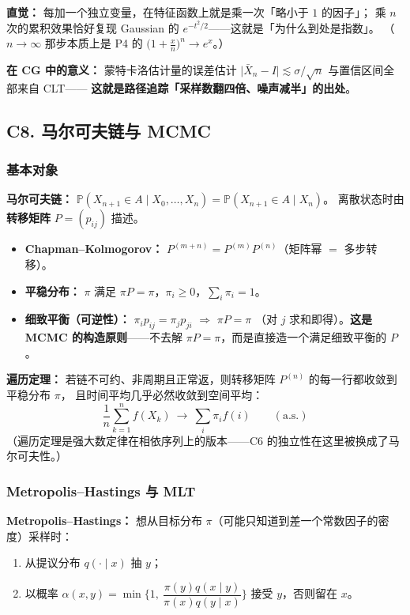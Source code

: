\textbf{直觉：} 每加一个独立变量，在特征函数上就是乘一次「略小于 $1$ 的因子」；
乘 $n$ 次的累积效果恰好复现 Gaussian 的 $e^{-t^2/2}$——这就是「为什么到处是指数」。
（$n\to\infty$ 那步本质上是 P4 的 $\big(1+\frac xn\big)^n\to e^x$。）

\textbf{在 CG 中的意义：} 蒙特卡洛估计量的误差估计
$\big|\bar X_n-I\big|\lesssim \sigma/\sqrt n$ 与置信区间全部来自 CLT——
\textbf{这就是路径追踪「采样数翻四倍、噪声减半」的出处}。

\subsection{C8. 马尔可夫链与 MCMC}

\subsubsection{基本对象}

\textbf{马尔可夫链：} $\mathbb P(X_{n+1}\in A\mid X_0,\dots,X_n)=\mathbb P(X_{n+1}\in A\mid X_n)$。
离散状态时由\textbf{转移矩阵} $P=(p_{ij})$ 描述。

\begin{itemize}
  \item \textbf{Chapman--Kolmogorov：} $P^{(m+n)}=P^{(m)}P^{(n)}$（矩阵幂 $=$ 多步转移）。
  \item \textbf{平稳分布：} $\pi$ 满足 $\pi P=\pi$，$\pi_i\ge0$，$\sum_i\pi_i=1$。
  \item \textbf{细致平衡（可逆性）：} $\pi_ip_{ij}=\pi_jp_{ji}$ $\Longrightarrow$ $\pi P=\pi$
        （对 $j$ 求和即得）。\textbf{这是 MCMC 的构造原则}——不去解 $\pi P=\pi$，而是直接造一个满足细致平衡的 $P$。
\end{itemize}

\textbf{遍历定理：} 若链不可约、非周期且正常返，则转移矩阵 $P^{(n)}$ 的每一行都收敛到平稳分布 $\pi$，
且时间平均几乎必然收敛到空间平均：
\[
\frac1n\sum_{k=1}^n f(X_k)\ \longrightarrow\ \sum_i\pi_i f(i)\qquad(\text{a.s.})
\]
（遍历定理是强大数定律在相依序列上的版本——C6 的独立性在这里被换成了马尔可夫性。）

\subsubsection{Metropolis--Hastings 与 MLT}

\textbf{Metropolis--Hastings：} 想从目标分布 $\pi$（可能只知道到差一个常数因子的密度）采样时：

\begin{enumerate}
  \item 从提议分布 $q(\cdot\mid x)$ 抽 $y$；
  \item 以概率 $\alpha(x,y)=\min\Big\{1,\ \dfrac{\pi(y)q(x\mid y)}{\pi(x)q(y\mid x)}\Big\}$ 接受 $y$，否则留在 $x$。
\end{enumerate}

